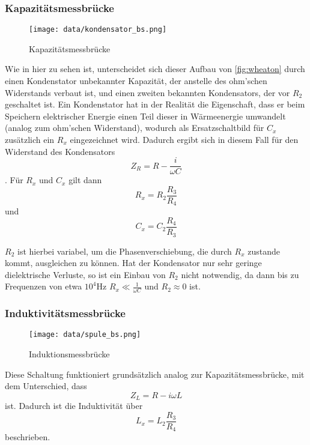 \subsubsection{Kapazitätsmessbrücke}
\begin{figure}
\centering
\texttt{[image: data/kondensator\_bs.png]}
\caption{Kapazitätsmessbrücke}
\label{fig:kapa}
\end{figure}
Wie in hier zu sehen ist, unterscheidet sich dieser Aufbau von \ref{fig:wheaton} durch 
einen Kondenstator unbekannter Kapazität, der anstelle des ohm'schen Widerstands verbaut ist, und einen zweiten
bekannten Kondensators, der vor $R_2$ geschaltet ist. 
Ein Kondenstator hat in der 
Realität die Eigenschaft, dass er beim Speichern elektrischer Energie einen Teil dieser in Wärmeenergie umwandelt
(analog zum ohm'schen Widerstand),
wodurch als Ersatzschaltbild für $C_x$ zusätzlich ein $R_x$ eingezeichnet wird. 
Dadurch ergibt sich in diesem Fall für den Widerstand des Kondensators  \begin{equation} Z_R = R - \frac{i}{\omega C}
\end{equation}.
Für $R_x$ und $C_x$ gilt dann 
\begin{equation}
\label{eqn:kapa1}
  R_x = R_2 \frac{R_3}{R_4} 
\end{equation}
 \quad und
\begin{equation}
\label{eqn:kapa2}
   C_x = C_2 \frac{R_4}{R_3} 
\end{equation}


$R_2$ ist hierbei variabel, um die Phasenverschiebung, die durch $R_x$ zustande kommt, ausgleichen zu können.
Hat der Kondensator nur sehr geringe dielektrische Verluste, so ist ein Einbau von $R_2$ nicht notwendig, 
da dann bis zu Frequenzen von etwa $10^4\si{\hertz}$ $R_x \ll \frac{1}{\omega C}$ und 
$R_2 \approx 0$ ist.

\subsubsection{Induktivitätsmessbrücke}

\begin{figure}
\centering
\texttt{[image: data/spule\_bs.png]}
\caption{Induktionsmessbrücke}
\label{fig:spule}
\end{figure}
Diese Schaltung funktioniert grundsätzlich analog zur Kapazitätsmessbrücke, mit dem Unterschied, dass 
\begin{equation*}
    Z_L = R - i\omega L
\end{equation*}
ist. Dadurch ist die Induktivität über \begin{equation}
\label{eqn:induk}
    L_x = L_2 \frac{R_3}{R_4}
\end{equation} beschrieben.

